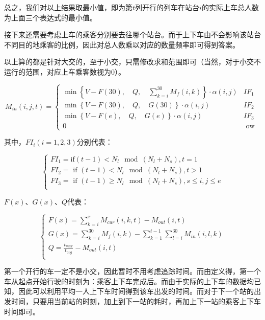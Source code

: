 总之，我们对以上结果取最小值，即为第$t$列开行的列车在站台$i$的实际上车总人数为上面三个表达式的最小值。

接下来还需要考虑上车的乘客分别要去往哪个站台。而于上下车由不会影响该站台不同目的地乘客的比例，因此对总人数乘以对应的数量频率即可得到答案。

以上算的都是针对大交的，至于小交，只需修改求和范围即可（当然，对于小交不运行的范围，对应上车乘客数视为$0$）。

\begin{equation}
M_{in}(i, j, t) = 
	\begin{cases}
	\min \left\{
	 	V - F(30), \quad
	  	Q, \quad
	  	\sum _{k = i} ^{30} M_f(i, k)
	\right\} \cdot \alpha(i, j) &  IF_1\\
	\min \left\{
	 	V - F(30), \quad
	  	Q, \quad
        G(30)
	\right\} \cdot \alpha(i, j) &  IF_2\\
	\min \left\{
	 	V - F(e), \quad
	  	Q, \quad
        G(e)
	\right\} \cdot \alpha(i, j) &  IF_3\\
	0 & \text{ ow } 
	\end{cases}
\end{equation}

其中，$FI_i(i=1,2,3)$分别代表：

\begin{equation*}
    \begin{cases}
        FI_1 = \text{if}(t-1)<N_l\mod(N_l+N_s), t = 1  \\
        FI_2 = \text{ if } (t - 1) < N_l \mod (N_l + N_s), t > 1    \\
        FI_3 = \text{ if } (t - 1) \geq N_l \mod (N_l + N_s), s \leq i, j \leq e \\
    \end{cases}
\end{equation*}

$F(x)$、$G(x)$、$Q$代表：

\begin{equation*}
    \begin{cases}
        F(x) = \sum _{k = i} ^{x} M_{cur}(i, k, t) - M_{out}(i, t)  \\
        G(x) = \sum _{k = i} ^{30} M_f(i, k) - \sum _{k = 1} ^{t - 1} \sum _{l = i} ^{30} M_{in}(i, l, k)   \\
        Q = \frac {t_{max}} {t_{avg}} - M_{out}(i, t)   \\
    \end{cases}
\end{equation*}


第一个开行的车一定不是小交，因此暂时不用考虑追踪时间。而由定义得，第一个车从起点开始行驶的时刻为：乘客上下车完成后。而由于实际的上下车的数据均已知，因此可以利用平均一人上下车时间得到该车出发的时间。而对于下一个站的出发时间，只要用当前站的时刻，加上到下一站的耗时，再加上下一站的乘客上下车时间即可。

